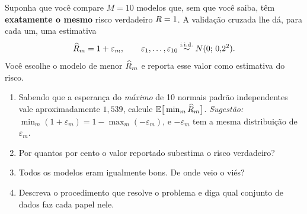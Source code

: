 \documentclass[11pt,a4paper]{article}
\begin{document}
\begin{exercicio}
Suponha que você compare $M=10$ modelos que, sem que você saiba, têm
\textbf{exatamente o mesmo} risco verdadeiro $R=1$. A validação cruzada lhe
dá, para cada um, uma estimativa
\[
  \widehat{R}_m = 1 + \varepsilon_m,
  \qquad \varepsilon_1,\dots,\varepsilon_{10}
  \stackrel{\text{i.i.d.}}{\sim} N(0;\,0{,}2^2).
\]
Você escolhe o modelo de menor $\widehat{R}_m$ e reporta esse valor como estimativa
do risco.
\begin{enumerate}[label=(\alph*),leftmargin=1.1cm]
  \item Sabendo que a esperança do \emph{máximo} de 10 normais padrão
        independentes vale aproximadamente $1{,}539$, calcule
        $\mathbb{E}\big[\min_m \widehat{R}_m\big]$.
        \emph{Sugestão:} $\min_m(1+\varepsilon_m) = 1 - \max_m(-\varepsilon_m)$, e
        $-\varepsilon_m$ tem a mesma distribuição de $\varepsilon_m$.
  \item Por quantos por cento o valor reportado subestima o risco verdadeiro?
  \item Todos os modelos eram igualmente bons. De onde veio o viés?
  \item Descreva o procedimento que resolve o problema e diga qual conjunto de
        dados faz cada papel nele.
\end{enumerate}
\end{exercicio}
\end{document}
